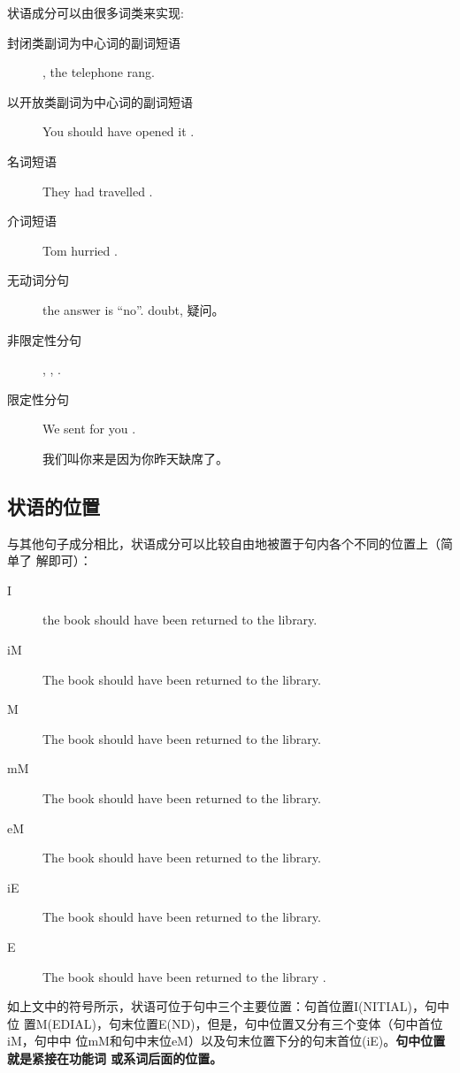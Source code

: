 状语成分可以由很多词类来实现:
\begin{description}
\item[封闭类副词为中心词的副词短语] , the telephone rang.
\item[以开放类副词为中心词的副词短语] You should have opened it .
\item[名词短语] They had travelled .
\item[介词短语] Tom hurried .
\item[无动词分句]  the answer is ``no''. doubt, 疑问。
\item[非限定性分句]  , , .
\item[限定性分句] We sent for you .

  我们叫你来是因为你昨天缺席了。
\end{description}

\subsection{状语的位置}

与其他句子成分相比，状语成分可以比较自由地被置于句内各个不同的位置上（简单了
解即可）：
\begin{description}
\item[I]  the book should have been returned to the library.
\item[iM] The book  should have been returned to the library.
\item[M] The book should  have been returned to the library.
\item[mM] The book should have  been returned to the library.
\item[eM] The book should have been  returned to the library.
\item[iE] The book should have been returned  to the library.
\item[E] The book should have been returned to the library .
\end{description}

如上文中的符号所示，状语可位于句中三个主要位置：句首位置I(NITIAL)，句中位
置M(EDIAL)，句末位置E(ND)，但是，句中位置又分有三个变体（句中首位iM，句中中
位mM和句中末位eM）以及句末位置下分的句末首位(iE)。\textbf{句中位置就是紧接在功能词
  或系词后面的位置。}

